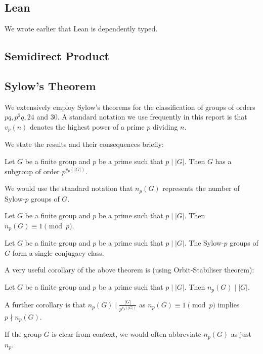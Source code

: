 \documentclass[a4paper,11pt, titlepage]{article}
\theoremstyle{remark}
\begin{document}
\subsection{Lean}
We wrote earlier that Lean is dependently typed.

\subsection{Semidirect Product}

\subsection{Sylow's Theorem}

We extensively employ Sylow's theorems for the classification of groups of orders $pq, p^2q, 24$ and $30$. A standard notation we use frequently in this report is that $v_p(n)$ denotes the highest power of a prime $p$ dividing $n$.

We state the results and their consequences briefly:

\begin{theorem}
    Let $G$ be a finite group and $p$ be a prime such that $p \mid |G|$. Then $G$ has a subgroup of order $p^{v_p(|G|)}$.
\end{theorem}

We would use the standard notation that $n_p(G)$ represents the number of Sylow-$p$ groups of $G$.

\begin{theorem}
    Let $G$ be a finite group and $p$ be a prime such that $p \mid |G|$. Then $n_p(G) \equiv 1 \pmod p$.
\end{theorem}
\begin{theorem}
    Let $G$ be a finite group and $p$ be a prime such that $p \mid |G|$. The Sylow-$p$ groups of $G$ form a single conjugacy class.
\end{theorem}
A very useful corollary of the above theorem is (using Orbit-Stabiliser theorem):
\begin{corollary}
    Let $G$ be a finite group and $p$ be a prime such that $p \mid |G|$. Then $n_p(G) \mid |G|$.
\end{corollary}

A further corollary is that $n_p(G) \mid \frac{|G|}{p^{v_p(|G|)}}$ as $n_p(G) \equiv 1 \pmod p$ implies $p \nmid n_p(G)$.

If the group $G$ is clear from context, we would often abbreviate $n_p(G)$ as just $n_p$.
\end{document}
